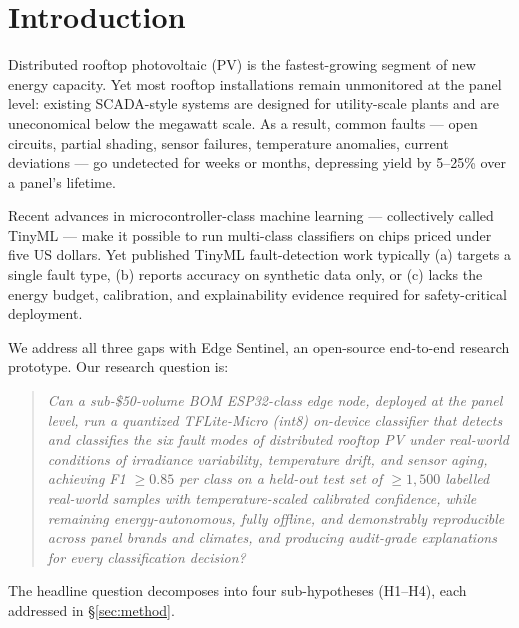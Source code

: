 \documentclass[12pt,journal,onecolumn]{IEEEtran}
\begin{document}
\section{Introduction}
\label{sec:intro}

Distributed rooftop photovoltaic (PV) is the fastest-growing segment of new
energy capacity. Yet most rooftop installations remain unmonitored at the
panel level: existing SCADA-style systems are designed for utility-scale
plants and are uneconomical below the megawatt scale. As a result, common
faults --- open circuits, partial shading, sensor failures, temperature
anomalies, current deviations --- go undetected for weeks or months,
depressing yield by 5--25\% over a panel's lifetime.

Recent advances in microcontroller-class machine learning --- collectively
called TinyML --- make it possible to run multi-class classifiers on chips
priced under five US dollars. Yet published TinyML fault-detection work
typically (a) targets a single fault type, (b) reports accuracy on
synthetic data only, or (c) lacks the energy budget, calibration, and
explainability evidence required for safety-critical deployment.

We address all three gaps with Edge Sentinel, an open-source end-to-end
research prototype. Our research question is:

\begin{quote}
\emph{Can a sub-\$50-volume BOM ESP32-class edge node, deployed at the
panel level, run a quantized TFLite-Micro (int8) on-device classifier
that detects and classifies the six fault modes of distributed rooftop
PV under real-world conditions of irradiance variability, temperature
drift, and sensor aging, achieving F1 $\geq 0.85$ per class on a
held-out test set of $\geq 1{,}500$ labelled real-world samples with
temperature-scaled calibrated confidence, while remaining
energy-autonomous, fully offline, and demonstrably reproducible across
panel brands and climates, and producing audit-grade explanations for
every classification decision?}
\end{quote}

The headline question decomposes into four sub-hypotheses (H1--H4),
each addressed in \S\ref{sec:method}.
\end{document}
